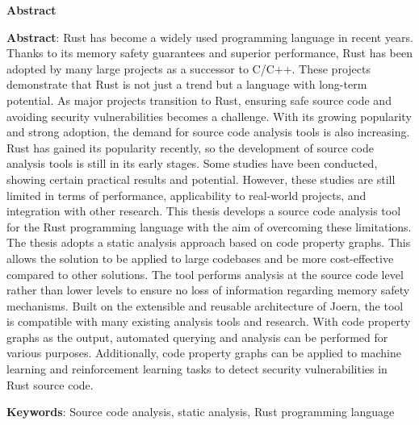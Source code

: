 \begin{center}
\textbf{\large{Abstract}}
\end{center}

\begin{small}

\textbf{Abstract}:
Rust has become a widely used programming language in recent years.
Thanks to its memory safety guarantees and superior performance, Rust has been adopted by many large projects as a successor to C/C++.
These projects demonstrate that Rust is not just a trend but a language with long-term potential.
As major projects transition to Rust, ensuring safe source code and avoiding security vulnerabilities becomes a challenge.
With its growing popularity and strong adoption, the demand for source code analysis tools is also increasing.
Rust has gained its popularity recently, so the development of source code analysis tools is still in its early stages.
Some studies have been conducted, showing certain practical results and potential.
However, these studies are still limited in terms of performance, applicability to real-world projects, and integration with other research.
This thesis develops a source code analysis tool for the Rust programming language with the aim of overcoming these limitations.
The thesis adopts a static analysis approach based on code property graphs.
This allows the solution to be applied to large codebases and be more cost-effective compared to other solutions.
The tool performs analysis at the source code level rather than lower levels to ensure no loss of information regarding memory safety mechanisms.
Built on the extensible and reusable architecture of Joern, the tool is compatible with many existing analysis tools and research.
With code property graphs as the output, automated querying and analysis can be performed for various purposes.
Additionally, code property graphs can be applied to machine learning and reinforcement learning tasks to detect security vulnerabilities in Rust source code.

\vspace*{1cm}
\textbf{Keywords}: Source code analysis, static analysis, Rust programming language
\end{small}